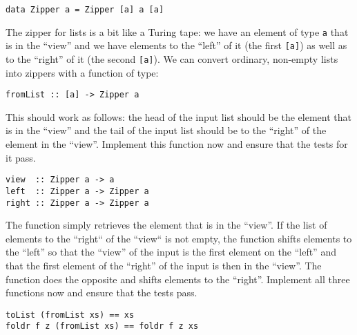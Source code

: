 \begin{verbatim}
data Zipper a = Zipper [a] a [a]
\end{verbatim}
The zipper for lists is a bit like a Turing tape: we have an element of type \texttt{\small a} that is in the ``view'' and we have elements to the ``left'' of it (the first \texttt{\small [a]}) as well as to the ``right'' of it (the second \texttt{\small [a]}). We can convert ordinary, non-empty lists into zippers with a function of type:
\begin{verbatim}
fromList :: [a] -> Zipper a
\end{verbatim}
This should work as follows: the head of the input list should be the element that is in the ``view'' and the tail of the input list should be to the ``right'' of the element in the ``view''. Implement this function now and ensure that the tests for it pass.

\begin{verbatim}
view  :: Zipper a -> a 
left  :: Zipper a -> Zipper a 
right :: Zipper a -> Zipper a
\end{verbatim}
The  function simply retrieves the element that is in the ``view''. If the list of elements to the ``right`` of the ``view`` is not empty, the  function shifts elements to the ``left'' so that the ``view'' of the input is the first element on the ``left'' and that the first element of the ``right'' of the input is then in the ``view''. The  function does the opposite and shifts elements to the ``right''. Implement all three functions now and ensure that the tests pass.

\begin{verbatim}
toList (fromList xs) == xs
foldr f z (fromList xs) == foldr f z xs
\end{verbatim}


